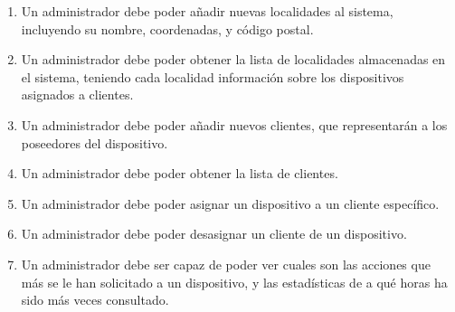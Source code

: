 \begin{enumerate}[label=RF\arabic* -]
    \item Un administrador debe poder añadir nuevas localidades al sistema, incluyendo su nombre, coordenadas, y código postal.
    
    \item Un administrador debe poder obtener la lista de localidades almacenadas en el sistema, teniendo cada localidad información sobre los dispositivos asignados a clientes.
    
    \item Un administrador debe poder añadir nuevos clientes, que representarán a los poseedores del dispositivo. 
    
    \item Un administrador debe poder obtener la lista de clientes.
    
    \item Un administrador debe poder asignar un dispositivo a un cliente específico.
    
    \item Un administrador debe poder desasignar un cliente de un dispositivo.
    
    \item Un administrador debe ser capaz de poder ver cuales son las acciones que más se le han solicitado a un dispositivo, y las estadísticas de a qué horas ha sido más veces consultado.

\end{enumerate}

